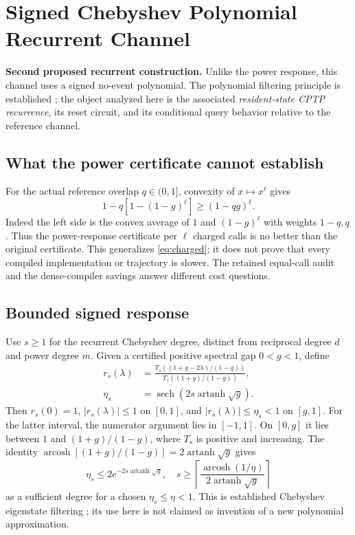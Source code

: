 \documentclass{ieeeaccess}
\begin{document}

\section{Signed Chebyshev Polynomial Recurrent Channel}\label{sec:cheb}
\textbf{Second proposed recurrent construction.} Unlike the power response, this channel uses a signed no-event polynomial. The polynomial filtering principle is established \cite{filter}; the object analyzed here is the associated \emph{resident-state CPTP recurrence}, its reset circuit, and its conditional query behavior relative to the reference channel.
\subsection{What the power certificate cannot establish}
For the actual reference overlap $q\in(0,1]$, convexity of $x\mapsto x^\ell$ gives
\begin{equation}\label{eq:powerq}
1-q[1-(1-g)^\ell]\ge(1-qg)^\ell.
\end{equation}
Indeed the left side is the convex average of $1$ and $(1-g)^\ell$ with weights $1-q,q$. Thus the power-response certificate per $\ell$ charged calls is no better than the original certificate. This generalizes \eqref{eq:charged}; it does not prove that every compiled implementation or trajectory is slower. The retained equal-call audit and the dense-compiler savings answer different cost questions.

\subsection{Bounded signed response}
Use $s\ge1$ for the recurrent Chebyshev degree, distinct from reciprocal degree $d$ and power degree $m$. Given a certified positive spectral gap $0<g<1$, define
\begin{equation}\label{eq:chebr}
\begin{aligned}
r_s(\lambda)&=\frac{T_s((1+g-2\lambda)/(1-g))}{T_s((1+g)/(1-g))},\\
\eta_s&=\operatorname{sech}(2s\operatorname{artanh}\sqrt g).
\end{aligned}
\end{equation}
Then $r_s(0)=1$, $|r_s(\lambda)|\le1$ on $[0,1]$, and $|r_s(\lambda)|\le\eta_s<1$ on $[g,1]$. For the latter interval, the numerator argument lies in $[-1,1]$. On $[0,g]$ it lies between $1$ and $(1+g)/(1-g)$, where $T_s$ is positive and increasing. The identity $\operatorname{arcosh}[(1+g)/(1-g)]=2\operatorname{artanh}\sqrt g$ gives
\begin{equation}\label{eq:chebeta}
\eta_s\le2e^{-2s\operatorname{artanh}\sqrt g},\quad
s\ge\left\lceil\frac{\operatorname{arcosh}(1/\eta)}{2\operatorname{artanh}\sqrt g}\right\rceil
\end{equation}
as a sufficient degree for a chosen $\eta_s\le\eta<1$. This is established Chebyshev eigenstate filtering \cite{filter}; its use here is not claimed as invention of a new polynomial approximation.
\end{document}
